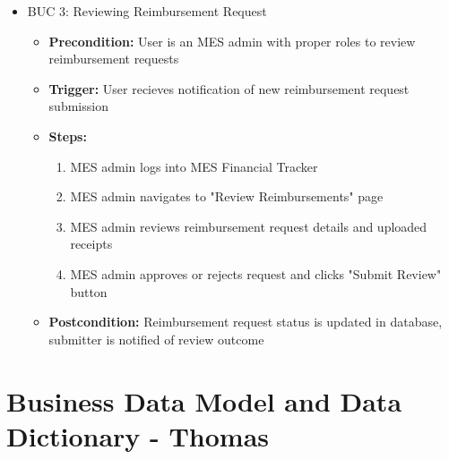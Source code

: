 \documentclass[12pt]{article}
\begin{document}
\begin{itemize}
    \item BUC 3: Reviewing Reimbursement Request
      \begin{itemize}
        \item \textbf{Precondition:} User is an MES admin with proper roles to review reimbursement requests
        \item \textbf{Trigger:} User recieves notification of new reimbursement request submission
        \item \textbf{Steps:}
          \begin{enumerate}
            \item MES admin logs into MES Financial Tracker
            \item MES admin navigates to "Review Reimbursements" page
            \item MES admin reviews reimbursement request details and uploaded receipts
            \item MES admin approves or rejects request and clicks "Submit Review" button
          \end{enumerate}
        \item \textbf{Postcondition:} Reimbursement request status is updated in database, submitter is notified of review outcome 
      \end{itemize}
  \end{itemize}



\section{Business Data Model and Data Dictionary - Thomas}
\end{document}
